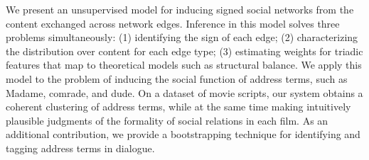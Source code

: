 We present an unsupervised model for inducing signed social networks from the content exchanged across network edges. Inference in this model solves three problems simultaneously: (1) identifying the sign of each edge; (2) characterizing the distribution over content for each edge type; (3) estimating weights for triadic features that map to theoretical models such as structural balance. We apply this model to the problem of inducing the social function of address terms, such as Madame, comrade, and dude. On a dataset of movie scripts, our system obtains a coherent clustering of address terms, while at the same time making intuitively plausible judgments of the formality of social relations in each film. As an additional contribution, we provide a bootstrapping technique for identifying and tagging address terms in dialogue.
